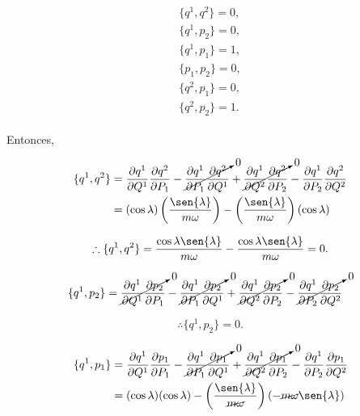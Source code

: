 \documentclass[a4paper,10pt]{article}
\numberwithin{equation}{section}
\begin{document}
\begin{align}
 \begin{split}
  \{q^1,q^2\} = 0, \\
  \{q^1,p_2\} = 0, \\
  \{q^1,p_1\} = 1, \\
  \{p_1,p_2\} = 0, \\
  \{q^2,p_1\} = 0, \\
  \{q^2,p_2\} = 1.
 \end{split}
\end{align}

Entonces, 

\begin{align*}
  \{q^1,q^2\} &= \frac{\partial q^1}{\partial Q^1}\frac{\partial q^2}{\partial P_1} - 
 \cancelto{0}{\frac{\partial q^1}{\partial P_1}\frac{\partial q^2}{\partial Q^1}} + 
 \cancelto{0}{\frac{\partial q^1}{\partial Q^2}\frac{\partial q^2}{\partial P_2}} -
 \frac{\partial q^1}{\partial P_2}\frac{\partial q^2}{\partial Q^2} \\
 &= (\cos{\lambda})\left(\frac{\sen{\lambda}}{m\omega}\right) - 
 \left(\frac{\sen{\lambda}}{m\omega}\right)(\cos{\lambda}) 
\end{align*}

\begin{equation}
 \therefore  \{q^1,q^2\} =  \frac{\cos{\lambda}\sen{\lambda}}{m\omega} -
 \frac{\cos{\lambda}\sen{\lambda}}{m\omega} =0.
\end{equation}

\begin{align*}
 \{q^1,p_2\} &= \cancelto{0}{\frac{\partial q^1}{\partial Q^1}\frac{\partial p_2}{\partial P_1}} - 
 \cancelto{0}{\frac{\partial q^1}{\partial P_1}\frac{\partial p_2}{\partial Q^1}} + 
 \cancelto{0}{\frac{\partial q^1}{\partial Q^2}\frac{\partial p_2}{\partial P_2}} -
 \cancelto{0}{\frac{\partial q^1}{\partial P_2}\frac{\partial p_2}{\partial Q^2}}
\end{align*}

\begin{equation}
 \therefore  \{q^1,p_2\} = 0.
\end{equation}


\begin{align*}
 \{q^1,p_1\} &= \frac{\partial q^1}{\partial Q^1}\frac{\partial p_1}{\partial P_1} - 
 \cancelto{0}{\frac{\partial q^1}{\partial P_1}\frac{\partial p_1}{\partial Q^1}} + 
 \cancelto{0}{\frac{\partial q^1}{\partial Q^2}\frac{\partial p_1}{\partial P_2}} -
 \frac{\partial q^1}{\partial P_2}\frac{\partial p_1}{\partial Q^2} \\
 &= (\cos{\lambda})(\cos{\lambda}) - \left(\frac{\sen{\lambda}}{\cancel{m\omega}}\right)
 (- \cancel{m\omega} \sen{\lambda})
\end{align*}
\end{document}

